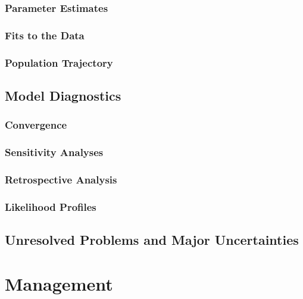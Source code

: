 \documentclass[
]{scrartcl}
\begin{document}
\subsubsection{Parameter Estimates}\label{parameter-estimates}

\subsubsection{Fits to the Data}\label{fits-to-the-data}

\subsubsection{Population Trajectory}\label{population-trajectory}

\newpage{}

\subsection{Model Diagnostics}\label{model-diagnostics}

\subsubsection{Convergence}\label{convergence}

\subsubsection{Sensitivity Analyses}\label{sensitivity-analyses}

\subsubsection{Retrospective Analysis}\label{retrospective-analysis}

\subsubsection{Likelihood Profiles}\label{likelihood-profiles}

\subsection{Unresolved Problems and Major
Uncertainties}\label{unresolved-problems-and-major-uncertainties-1}

\newpage{}

\section{Management}\label{management}
\end{document}
